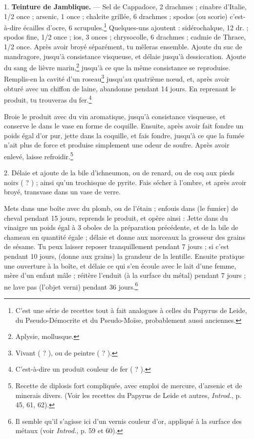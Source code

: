 \documentclass[a4paper, 11pt, oneside, polutonikogreek, french]{article}
\begin{document}
1. \textbf{Teinture de Jamblique.} --- Sel de Cappadoce, 2 drachmes ; cinabre d'Italie, 1/2 once ; arsenic, 1 once ; chalcite grillée, 6 drachmes ; spodos (ou scorie) c'est-à-dire écailles d'ocre, 6 scrupules.\footnote{C'est une série de recettes tout à fait analogues à celles du Papyrus de Leide, du Pseudo-Démocrite et du Pseudo-Moïse, probablement aussi anciennes.} Quelques-uns ajoutent : sidérochalque, 12 dr. ; spodos fine, 1/2 once ; ios, 3 onces ; chrysocolle, 6 drachmes ; cadmie de Thrace, 1/2 once. Après avoir broyé séparément, tu mêleras ensemble. Ajoute du suc de mandragore, jusqu'à consistance visqueuse, et délaie jusqu'à dessiccation. Ajoute du sang de lièvre marin,\footnote{Aplysie, mollusque.} jusqu'à ce que la même consistance se reproduise. Remplis-en la cavité d'un roseau\footnote{Vivant ( ? ), ou de peintre ( ? ).} jusqu'au quatrième nœud, et, après avoir obturé avec un chiffon de laine, abandonne pendant 14 jours. En reprenant le produit, tu trouveras du fer.\footnote{C'est-à-dire un produit couleur de fer ( ? ).}

Broie le produit avec du vin aromatique, jusqu'à consistance visqueuse, et conserve le dans le vase en forme de coquille. Ensuite, après avoir fait fondre un poids égal d'or pur, jette dans la coquille, et fais fondre, jusqu'à ce que la fumée n'ait plus de force et produise simplement une odeur de soufre. Après avoir enlevé, laisse refroidir.\footnote{Recette de diplosis fort compliquée, avec emploi de mercure, d'arsenic et de minerais divers. (Voir les recettes du Papyrus de Leide et autres, \emph{Introd.}, p. 45, 61, 62).}

2. Délaie et ajoute de la bile d'ichneumon, ou de renard, ou de coq aux pieds noirs ( ? ) ; ainsi qu'un trochisque de pyrite. Fais sécher à l'ombre, et après avoir broyé, transvase dans un vase de verre.

Mets dans une boîte avec du plomb, ou de l'étain ; enfouis dans (le fumier) de cheval pendant 15 jours, reprends le produit, et opère ainsi : Jette dans du vinaigre un poids égal à 3 oboles de la préparation précédente, et de la bile de chameau en quantité égale ; délaie et donne aux morceaux la grosseur des grains de sésame. Tu peux laisser reposer tranquillement pendant 7 jours ; si c'est pendant 10 jours, (donne aux grains) la grandeur de la lentille. Ensuite pratique une ouverture à la boîte, et délaie ce qui s'en écoule avec le lait d'une femme, mère d'un enfant mâle ; réitère l'enduit (à la surface du métal) pendant 7 jours ; ne lave pas (l'objet verni) pendant 36 jours.\footnote{Il semble qu'il s'agisse ici d'un vernis couleur d'or, appliqué à la surface des métaux (voir \emph{Introd.}, p. 59 et 60).}
\end{document}
